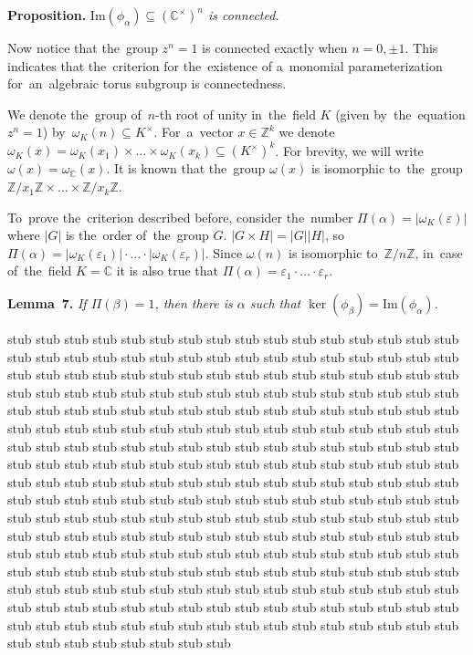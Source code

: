\documentclass[twoside]{article}
\begin{document}
\medskip\noindent\textbf{Proposition.}\emph{
    $\mathrm{Im}(\phi_\alpha) \subseteq (\mathbb{C}^\times)^n$ is connected.
}\medskip

Now notice that the~group $z^n = 1$ is connected exactly when $n = 0, \pm 1$.
This indicates that the~criterion for the~existence of a~monomial parameterization
for~an~algebraic torus subgroup is connectedness.

We denote the~group of~$n$-th root of unity in~the~field $K$ (given by~the~equation $z^n = 1$) by~$\omega_K(n) \subseteq K^\times$.
For~a~vector $x \in \mathbb{Z}^k$ we denote $\omega_K(x) = \omega_K(x_1) \times \ldots \times \omega_K(x_k) \subseteq (K^\times)^k$.
For brevity, we will write $\omega(x) = \omega_\mathbb{C}(x)$. It is known that the~group $\omega(x)$ is isomorphic
to~the~group $\mathbb{Z} / x_1 \mathbb{Z} \times \ldots \times \mathbb{Z} / x_k \mathbb{Z}$.

To~prove the~criterion described before, consider the~number $\Pi(\alpha) = |\omega_K(\varepsilon)|$
where $|G|$ is the~order of~the~group $G$. $|G \times H| = |G| |H|$, so $\Pi(\alpha) = |\omega_K(\varepsilon_1)| \cdot \ldots \cdot |\omega_K(\varepsilon_r)|$.
Since $\omega(n)$ is isomorphic to~$\mathbb{Z} / n \mathbb{Z}$, in~case of~the~field $K = \mathbb{C}$ it is also true that
$\Pi(\alpha) = \varepsilon_1 \cdot \ldots \cdot \varepsilon_r$.

\medskip\noindent\textbf{Lemma~7.}\emph{
    If $\Pi(\beta) = 1$, then there is $\alpha$ such that $\ker(\phi_\beta) = \mathrm{Im}(\phi_\alpha)$.
}\medskip

stub stub stub stub stub stub stub stub stub stub stub stub stub stub stub stub stub stub stub stub stub stub stub stub stub stub stub stub
stub stub stub stub stub stub stub stub stub stub stub stub stub stub stub stub stub stub stub stub stub stub stub stub stub stub stub stub
stub stub stub stub stub stub stub stub stub stub stub stub stub stub stub stub stub stub stub stub stub stub stub stub stub stub stub stub
stub stub stub stub stub stub stub stub stub stub stub stub stub stub stub stub stub stub stub stub stub stub stub stub stub stub stub stub
stub stub stub stub stub stub stub stub stub stub stub stub stub stub stub stub stub stub stub stub stub stub stub stub stub stub stub stub
stub stub stub stub stub stub stub stub stub stub stub stub stub stub stub stub stub stub stub stub stub stub stub stub stub stub stub stub
stub stub stub stub stub stub stub stub stub stub stub stub stub stub stub stub stub stub stub stub stub stub stub stub stub stub stub stub
stub stub stub stub stub stub stub stub stub stub stub stub stub stub stub stub stub stub stub stub stub stub stub stub stub stub stub stub
stub stub stub stub stub stub stub stub stub stub stub stub stub stub stub stub stub stub stub stub stub stub stub stub stub stub stub stub
stub stub stub stub stub stub stub stub stub stub stub stub stub stub stub stub stub stub stub stub stub stub stub stub stub stub stub stub
\end{document}
